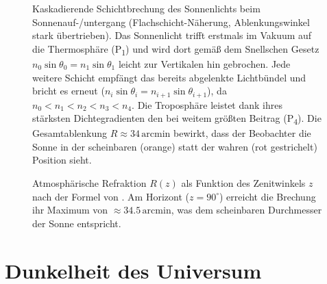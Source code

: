 \documentclass[12pt,a4paper]{article}
\providecommand{\ang}[1]{\ensuremath{#1\,\mathrm{arcmin}}}
\begin{document}
\begin{figure}[p]
\begin{tikzpicture}[scale=1.35, >=Stealth, font=\small]
\end{tikzpicture}
\caption{%
  Kaskadierende Schichtbrechung des Sonnenlichts beim Sonnenauf-/untergang
  (Flachschicht-Näherung, Ablenkungswinkel stark übertrieben).
  Das Sonnenlicht trifft erstmals im Vakuum auf die Thermosphäre (P\textsubscript{1})
  und wird dort gemäß dem Snellschen Gesetz $n_0\sin\theta_0 = n_1\sin\theta_1$
  leicht zur Vertikalen hin gebrochen.
  Jede weitere Schicht empfängt das bereits abgelenkte Lichtbündel
  und bricht es erneut ($n_i\sin\theta_i = n_{i+1}\sin\theta_{i+1}$),
  da $n_0 < n_1 < n_2 < n_3 < n_4$.
  Die Troposphäre leistet dank ihres stärksten Dichtegradienten
  den bei weitem größten Beitrag (P\textsubscript{4}).
  Die Gesamtablenkung $R \approx \ang{34}$ bewirkt,
  dass der Beobachter die Sonne in der scheinbaren (orange)
  statt der wahren (rot gestrichelt) Position sieht.%
}
\label{fig:refraktion}
\end{figure}

\begin{figure}[htbp]
\centering
{}
\caption{Atmosphärische Refraktion $R(z)$ als Funktion des Zenitwinkels $z$
         nach der Formel von \citet{Meeus1991}.
         Am Horizont ($z = 90^{\circ}$) erreicht die Brechung ihr Maximum
         von $\approx \ang{34.5}$,
         was dem scheinbaren Durchmesser der Sonne entspricht.}
\label{fig:refraktion_kurve}
\end{figure}

\section{Dunkelheit des Universum}
\label{sec:olbers}
\end{document}
